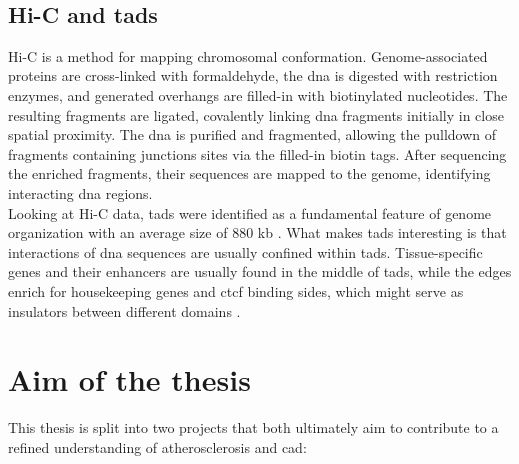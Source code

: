     \subsection{Hi-C and \acsp{tad}}
    Hi-C is a method for mapping chromosomal conformation. Genome-associated proteins are cross-linked with formaldehyde, the \ac{dna} is digested with restriction enzymes, and generated overhangs are filled-in with biotinylated nucleotides. The resulting fragments are ligated, covalently linking \ac{dna} fragments initially in close spatial proximity. The \ac{dna} is purified and fragmented, allowing the pulldown of fragments containing junctions sites via the filled-in biotin tags. After sequencing the enriched fragments, their sequences are mapped to the genome, identifying interacting \ac{dna} regions. \cite{lieberman-aidenComprehensiveMappingLongRange2009, witDecade3CTechnologies2012}\\
    Looking at Hi-C data, \acp{tad} were identified as a fundamental feature of genome organization with an average size of 880 kb \cite{dixonTopologicalDomainsMammalian2012, wang3DGenomeBrowser2018}. What makes \acp{tad} interesting is that interactions of \ac{dna} sequences are usually confined within \acp{tad}. Tissue-specific genes and their enhancers are usually found in the middle of \acp{tad}, while the edges enrich for housekeeping genes and \ac{ctcf} binding sides, which might serve as insulators between different domains \cite{pomboThreedimensionalGenomeArchitecture2015}.


\section{Aim of the thesis}
\label{sec:Aim}
This thesis is split into two projects that both ultimately aim to contribute to a refined understanding of atherosclerosis and \ac{cad}:


